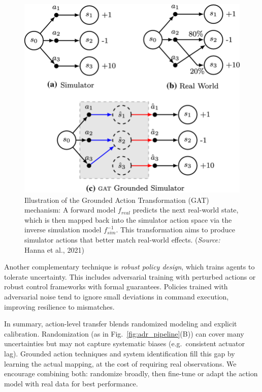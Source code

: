 \begin{figure}[H]
    \centering
    \includegraphics[width=0.95\linewidth]{figures/figGATMechanism.png}
    \caption{Illustration of the Grounded Action Transformation (GAT) mechanism: A forward model $f_{real}$ predicts the next real-world state, which is then mapped back into the simulator action space via the inverse simulation model $f_{sim}^{-1}$. This transformation aims to produce simulator actions that better match real-world effects. (\emph{Source:} Hanna et al., 2021)}
    \label{fig:gat_mechanism}
\end{figure}

Another complementary technique is \textit{robust policy design}, which trains agents to tolerate uncertainty. This includes adversarial training with perturbed actions or robust control frameworks with formal guarantees. Policies trained with adversarial noise tend to ignore small deviations in command execution, improving resilience to mismatches.

In summary, action-level transfer blends randomized modeling and explicit calibration. Randomization (as in Fig.~\ref{fig:adr_pipeline}(B)) can cover many uncertainties but may not capture systematic biases (e.g.\ consistent actuator lag). Grounded action techniques and system identification fill this gap by learning the actual mapping, at the cost of requiring real observations. We encourage combining both: randomize broadly, then fine-tune or adapt the action model with real data for best performance.

